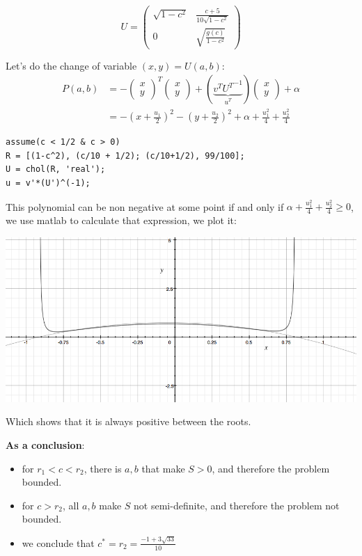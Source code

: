 \documentclass[11pt]{article}
\begin{document}
\[U =\begin{pmatrix}
 \sqrt{1 - c^2}  &  \frac{c + 5}{10\sqrt{1 - c^2}}\\
               0 & \sqrt{\frac{g(c)}{1-c^2}}
\end{pmatrix}
\]


Let's do the change of variable \((x, y) = U(a, b)\):
\begin{align*}P(a, b)
&= -\begin{pmatrix}x\\y\end{pmatrix}^T\begin{pmatrix}x\\y\end{pmatrix} +(\underbrace{v^T{U^T}^{-1}}_{u^T})\begin{pmatrix}x\\y\end{pmatrix}+ \alpha
\\&= - (x+\frac{u_1}2)^2 - (y+\frac{u_2}2)^2 + \alpha + \frac{u_1^2}4 + \frac{u_2^2}4
\end{align*}

\begin{verbatim}
assume(c < 1/2 & c > 0)
R = [(1-c^2), (c/10 + 1/2); (c/10+1/2), 99/100];
U = chol(R, 'real');
u = v'*(U')^(-1);
\end{verbatim}

This polynomial can be non negative at some point if and only if \(\alpha + \frac{u_1^2}4 + \frac{u_2^2}4 \ge 0\), we use matlab to calculate that expression, we plot it:

\includegraphics[width=.9\linewidth]{./poly.png}

Which shows that it is always positive between the roots.

\textbf{As a conclusion}:
\begin{itemize}
\item for \(r_1 < c < r_2\), there is \(a, b\) that make \(S > 0\), and therefore the problem bounded.
\item for \(c > r_2\), all \(a, b\) make \(S\) not semi-definite, and therefore the problem not bounded.
\item we conclude that \(c^* = r_2 = \frac{-1+3\sqrt{33}}{10}\)
\end{itemize}
\end{document}
